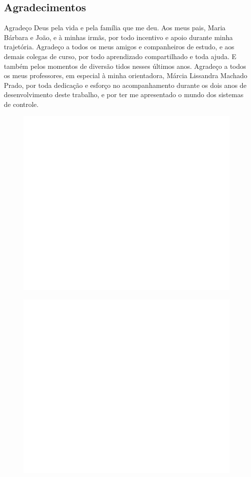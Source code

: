 \documentclass[journal,brazil,english]{IEEEtran}
\begin{document}
\begin{multicols}{2}
\section*{Agradecimentos}
Agradeço Deus pela vida e pela família que me deu. Aos meus pais, Maria Bárbara e João, e à minhas irmãs, por todo incentivo e apoio durante minha trajetória. Agradeço a todos os meus amigos e companheiros de estudo, e aos demais colegas de curso, por todo aprendizado compartilhado e toda ajuda. E também pelos momentos de diversão tidos nesses últimos anos. Agradeço a todos os meus professores, em especial à minha orientadora, Márcia Lissandra Machado Prado, por toda dedicação e esforço no acompanhamento durante os dois anos de desenvolvimento deste trabalho, e por ter me apresentado o mundo dos sistemas de controle.




\begin{figure}[H]
	\centering
\includegraphics[width=\columnwidth]{./imagens/embranco.png}
    \renewcommand{\figurename}{Fig.}
	\label{embranco}
\end{figure}
\begin{figure}[H]
	\centering
\includegraphics[width=.6\columnwidth]{./imagens/embranco.png}
    \renewcommand{\figurename}{Fig.}
	\label{embranco}
\end{figure}
\end{multicols}
\end{document}
